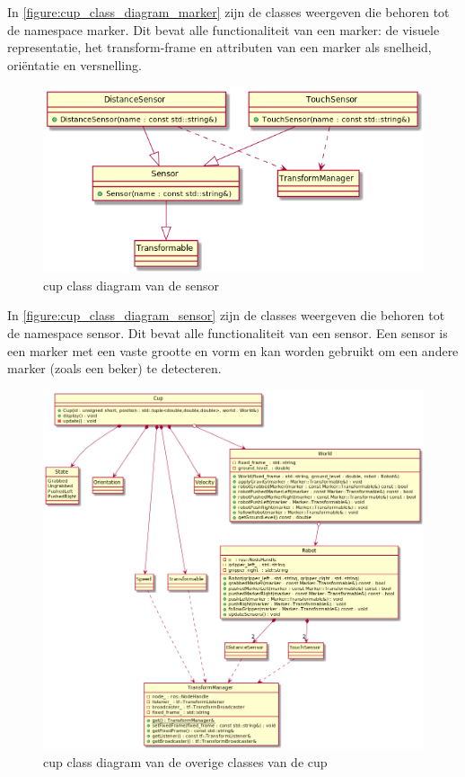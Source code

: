 \documentclass[11pt,titlepage]{article}
\begin{document}
In \autoref{figure:cup_class_diagram_marker} zijn de classes weergeven die behoren tot de namespace marker. Dit bevat alle functionaliteit van een marker: de visuele representatie, het transform-frame en attributen van een marker als snelheid, oriëntatie en versnelling.

\begin{figure}[H]
\centering
    \includegraphics[scale = .5]{cup_class_diagram_sensor.png}
    \caption{cup class diagram van de sensor}
    \label{figure:cup_class_diagram_sensor}
\end{figure}

In \autoref{figure:cup_class_diagram_sensor} zijn de classes weergeven die behoren tot de namespace sensor. Dit bevat alle functionaliteit van een sensor. Een sensor is een marker met een vaste grootte en vorm en kan worden gebruikt om een andere marker (zoals een beker) te detecteren.

\begin{figure}[H]
\centering
    \includegraphics[scale = .3]{cup_class_diagram.png}
    \caption{cup class diagram van de overige classes van de cup}
    \label{figure:cup_class_diagram}
\end{figure}
\end{document}
